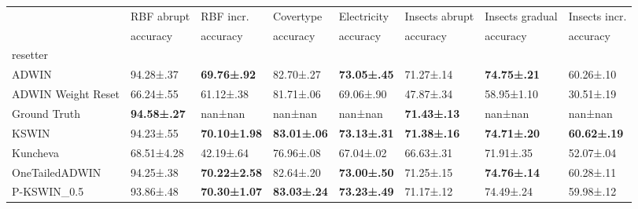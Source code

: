 \begin{tabular}{llllllll}
\toprule
 & RBF abrupt & RBF incr. & Covertype & Electricity & Insects abrupt & Insects gradual & Insects incr. \\
 & accuracy & accuracy & accuracy & accuracy & accuracy & accuracy & accuracy \\
resetter &  &  &  &  &  &  &  \\
\midrule
ADWIN & 94.28±.37 & \bfseries 69.76±.92 & 82.70±.27 & \bfseries 73.05±.45 & 71.27±.14 & \bfseries 74.75±.21 & 60.26±.10 \\
ADWIN Weight Reset & 66.24±.55 & 61.12±.38 & 81.71±.06 & 69.06±.90 & 47.87±.34 & 58.95±1.10 & 30.51±.19 \\
Ground Truth & \bfseries 94.58±.27 & nan±nan & nan±nan & nan±nan & \bfseries 71.43±.13 & nan±nan & nan±nan \\
KSWIN & 94.23±.55 & \bfseries 70.10±1.98 & \bfseries 83.01±.06 & \bfseries 73.13±.31 & \bfseries 71.38±.16 & \bfseries 74.71±.20 & \bfseries 60.62±.19 \\
Kuncheva & 68.51±4.28 & 42.19±.64 & 76.96±.08 & 67.04±.02 & 66.63±.31 & 71.91±.35 & 52.07±.04 \\
OneTailedADWIN & 94.25±.38 & \bfseries 70.22±2.58 & 82.64±.20 & \bfseries 73.00±.50 & 71.25±.15 & \bfseries 74.76±.14 & 60.28±.11 \\
P-KSWIN_0.5 & 93.86±.48 & \bfseries 70.30±1.07 & \bfseries 83.03±.24 & \bfseries 73.23±.49 & 71.17±.12 & 74.49±.24 & 59.98±.12 \\
\bottomrule
\end{tabular}
